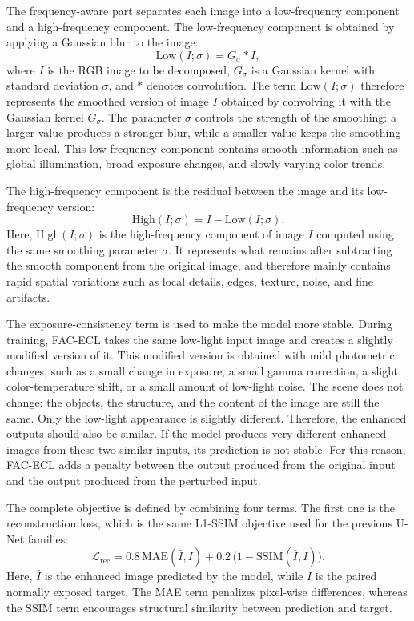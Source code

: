 The frequency-aware part separates each image into a low-frequency component and a high-frequency component. The low-frequency component is obtained by applying a Gaussian blur to the image:
\begin{equation}
	\mathrm{Low}(I;\sigma)
	=
	G_{\sigma} \ast I,
	\label{eq:fac_ecl_low_frequency}
\end{equation}
where $I$ is the RGB image to be decomposed, $G_{\sigma}$ is a Gaussian kernel with standard deviation $\sigma$, and $\ast$ denotes convolution. The term $\mathrm{Low}(I;\sigma)$ therefore represents the smoothed version of image $I$ obtained by convolving it with the Gaussian kernel $G_{\sigma}$. The parameter $\sigma$ controls the strength of the smoothing: a larger value produces a stronger blur, while a smaller value keeps the smoothing more local. This low-frequency component contains smooth information such as global illumination, broad exposure changes, and slowly varying color trends.

The high-frequency component is the residual between the image and its low-frequency version:
\begin{equation}
	\mathrm{High}(I;\sigma)
	=
	I - \mathrm{Low}(I;\sigma).
	\label{eq:fac_ecl_high_frequency}
\end{equation}
Here, $\mathrm{High}(I;\sigma)$ is the high-frequency component of image $I$ computed using the same smoothing parameter $\sigma$. It represents what remains after subtracting the smooth component from the original image, and therefore mainly contains rapid spatial variations such as local details, edges, texture, noise, and fine artifacts.

The exposure-consistency term is used to make the model more stable. During training, FAC-ECL takes the same low-light input image and creates a slightly modified version of it. This modified version is obtained with mild photometric changes, such as a small change in exposure, a small gamma correction, a slight color-temperature shift, or a small amount of low-light noise. The scene does not change: the objects, the structure, and the content of the image are still the same. Only the low-light appearance is slightly different. Therefore, the enhanced outputs should also be similar. If the model produces very different enhanced images from these two similar inputs, its prediction is not stable. For this reason, FAC-ECL adds a penalty between the output produced from the original input and the output produced from the perturbed input.

The complete objective is defined by combining four terms. The first one is the reconstruction loss, which is the same L1-SSIM objective used for the previous U-Net families:
\begin{equation}
	\mathcal{L}_{\mathrm{rec}}
	=
	0.8\,\mathrm{MAE}(\hat{I}, I)
	+
	0.2\,\bigl(1-\mathrm{SSIM}(\hat{I}, I)\bigr).
	\label{eq:fac_ecl_rec_loss}
\end{equation}
Here, $\hat{I}$ is the enhanced image predicted by the model, while $I$ is the paired normally exposed target. The MAE term penalizes pixel-wise differences, whereas the SSIM term encourages structural similarity between prediction and target.

